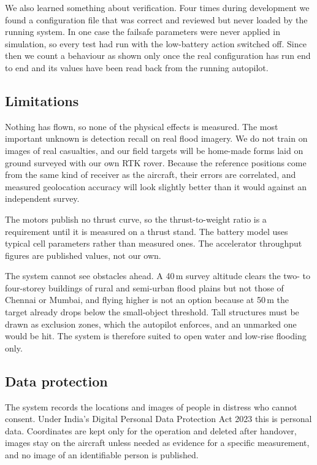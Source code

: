\documentclass[conference]{IEEEtran}
\begin{document}
We also learned something about verification. Four times during development we
found a configuration file that was correct and reviewed but never loaded by the
running system. In one case the failsafe parameters were never applied in
simulation, so every test had run with the low-battery action switched off.
Since then we count a behaviour as shown only once the real configuration has
run end to end and its values have been read back from the running autopilot.

\subsection{Limitations}

Nothing has flown, so none of the physical effects is measured. The most
important unknown is detection recall on real flood imagery. We do not train on
images of real casualties, and our field targets will be home-made forms laid
on ground surveyed with our own RTK rover. Because the reference positions come
from the same kind of receiver as the aircraft, their errors are correlated, and
measured geolocation accuracy will look slightly better than it would against an
independent survey.

The motors publish no thrust curve, so the thrust-to-weight ratio is a
requirement until it is measured on a thrust stand. The battery model uses
typical cell parameters rather than measured ones. The accelerator throughput
figures are published values, not our own.

The system cannot see obstacles ahead. A 40\,m survey altitude clears the two-
to four-storey buildings of rural and semi-urban flood plains but not those of
Chennai or Mumbai, and flying higher is not an option because at 50\,m the target
already drops below the small-object threshold. Tall structures must be drawn
as exclusion zones, which the autopilot enforces, and an unmarked one would be
hit. The system is therefore suited to open water and low-rise flooding only.

\subsection{Data protection}

The system records the locations and images of people in distress who cannot
consent. Under India's Digital Personal Data Protection Act 2023 this is personal
data. Coordinates are kept only for the operation and deleted after handover,
images stay on the aircraft unless needed as evidence for a specific
measurement, and no image of an identifiable person is published.
\end{document}
